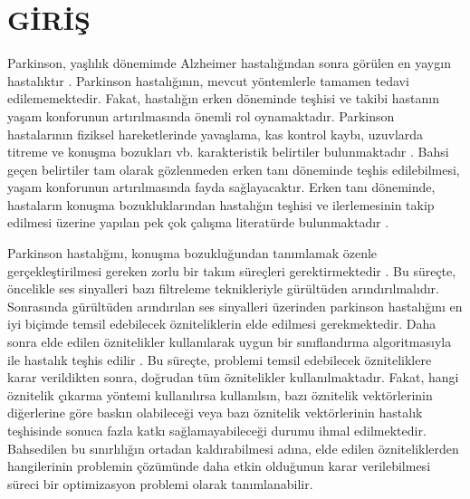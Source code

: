 \documentclass[conference]{IEEEtran}
\begin{document}

%
\IEEEpeerreviewmaketitle

\IEEEpubidadjcol

\section{GİRİŞ}

Parkinson, yaşlılık dönemimde Alzheimer hastalığından sonra görülen en yaygın hastalıktır \cite{deo2015machine}. Parkinson hastalığının, mevcut yöntemlerle tamamen tedavi edilememektedir. Fakat, hastalığın erken döneminde teşhisi ve takibi hastanın yaşam konforunun artırılmasında önemli rol oynamaktadır. Parkinson hastalarının fiziksel hareketlerinde yavaşlama, kas kontrol kaybı, uzuvlarda titreme ve konuşma bozukları vb. karakteristik belirtiler bulunmaktadır \cite{SAKAR2019255,cakmur2011parkinson}. Bahsi geçen belirtiler tam olarak gözlenmeden erken tanı döneminde teşhis edilebilmesi, yaşam konforunun artırılmasında fayda sağlayacaktır. Erken tanı döneminde, hastaların konuşma bozukluklarından hastalığın teşhisi ve ilerlemesinin takip edilmesi üzerine yapılan pek çok çalışma literatürde bulunmaktadır \cite{guruler2017novel,peker2016decision}.

Parkinson hastalığını, konuşma bozukluğundan tanımlamak özenle gerçekleştirilmesi gereken zorlu bir takım süreçleri gerektirmektedir \cite{caliskan2017diagnosis,ngumuh524658,gunduz2019deep}. Bu süreçte, öncelikle ses sinyalleri bazı filtreleme teknikleriyle gürültüden arındırılmalıdır. Sonrasında gürültüden arındırılan ses sinyalleri üzerinden parkinson hastalığını en iyi biçimde temsil edebilecek özniteliklerin elde edilmesi gerekmektedir. Daha sonra elde edilen öznitelikler kullanılarak uygun bir sınıflandırma algoritmasıyla ile hastalık teşhis edilir \cite{deo2015machine}. Bu süreçte, problemi temsil edebilecek özniteliklere karar verildikten sonra, doğrudan tüm öznitelikler kullanılmaktadır. Fakat, hangi öznitelik çıkarma yöntemi kullanılırsa kullanılsın, bazı öznitelik vektörlerinin diğerlerine göre baskın olabileceği veya bazı öznitelik vektörlerinin hastalık teşhisinde sonuca fazla katkı sağlamayabileceği durumu ihmal edilmektedir. Bahsedilen bu sınırlılığın ortadan kaldırabilmesi adına, elde edilen özniteliklerden hangilerinin problemin çözümünde daha etkin olduğunun karar verilebilmesi süreci bir optimizasyon problemi olarak tanımlanabilir.
\end{document}
